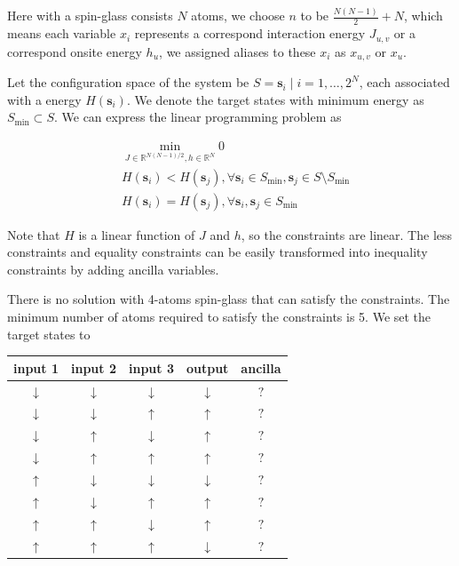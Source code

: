 \documentclass[twocolumn,superscriptaddress,english,showpacs,longbibliography]{revtex4-2}
\begin{document}
Here with a spin-glass consists $N$ atoms, we choose $n$ to be
$\frac{N(N-1)}{2} + N$, which means each variable $x_i$ represents a
correspond interaction energy $J_{u, v}$ or a correspond onsite energy
$h_u$, we assigned aliases to these $x_i$ as $x_{u,v}$ or
$x_{u}$.

Let the configuration space of the system be
$S = {\mathbf s_i\mid i=1,\ldots, 2^N}$, each associated with a
energy $H(\mathbf s_i)$. We denote the target states with minimum
energy as $S_{\text{min}} \subset S$. We can express the linear
programming problem as

\begin{equation}
    \begin{split}
        &\min_{J \in \mathbb{R}^{N(N{-}1)/2}, h\in \mathbb{R}^N} 0\\
        &H(\mathbf s_i) < H(\mathbf s_j), \forall \mathbf s_i \in S_{\text{min}}, \mathbf s_j \in S \setminus S_{\text{min}}\\
        &H(\mathbf s_i) = H(\mathbf s_j), \forall \mathbf s_i, \mathbf s_j \in S_{\text{min}}
    \end{split}
\end{equation}

Note that $H$ is a linear function of $J$ and $h$, so the
constraints are linear. The less constraints and equality constraints
can be easily transformed into inequality constraints by adding ancilla
variables.

There is no solution with 4-atoms spin-glass that can satisfy the
constraints. The minimum number of atoms required to satisfy the
constraints is 5. We set the target states to

\begin{tabular}{|c|c|c|c|c|}
\hline
input 1 & input 2 & input 3 & output & ancilla \\
\hline
$\downarrow$ & $\downarrow$ & $\downarrow$ & $\downarrow$ & $?$ \\
$\downarrow$ & $\downarrow$ & $\uparrow$ & $\uparrow$ & $?$ \\
$\downarrow$ & $\uparrow$ & $\downarrow$ & $\uparrow$ & $?$ \\
$\downarrow$ & $\uparrow$ & $\uparrow$ & $\uparrow$ & $?$ \\
$\uparrow$ & $\downarrow$ & $\downarrow$ & $\downarrow$ & $?$ \\
$\uparrow$ & $\downarrow$ & $\uparrow$ & $\uparrow$ & $?$ \\
$\uparrow$ & $\uparrow$ & $\downarrow$ & $\uparrow$ & $?$ \\
$\uparrow$ & $\uparrow$ & $\uparrow$ & $\downarrow$ & $?$ \\
\hline
\end{tabular}
\end{document}
